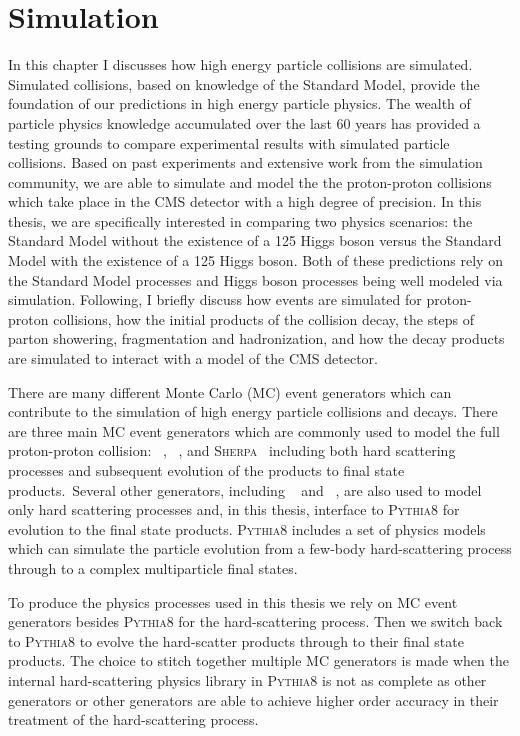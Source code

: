 \chapter{Simulation}
\label{sec:simulation}
In this chapter I discusses how high energy particle
collisions are simulated. Simulated collisions, based on knowledge of the Standard Model, provide 
the foundation of our predictions in high energy particle physics. 
The wealth of particle physics knowledge accumulated over the last 
60 years has provided a testing grounds to compare experimental results with
simulated particle collisions. Based on past experiments and extensive work from the simulation community,
we are able to simulate and model the the proton-proton collisions which take place in the
CMS detector with a high degree of precision. 
In this thesis, we are specifically interested in comparing two physics scenarios: the Standard Model 
without the existence of a 125 \GeV Higgs boson versus the Standard Model with the existence
of a 125 \GeV Higgs boson. Both of these predictions rely on the Standard Model processes and
Higgs boson processes being well modeled via simulation.
Following, I briefly discuss how events are simulated for proton-proton collisions,
how the initial products of the collision decay, the steps of parton showering,
fragmentation and hadronization, and how the decay products are simulated
to interact with a model of the CMS detector.

There are many different Monte Carlo (MC) event generators which can contribute to the 
simulation of high energy particle collisions and decays. There are three main MC event
generators which are commonly used to model the full proton-proton collision: 
\PYTHIA~\cite{Sjostrand:2014zea}, \HERWIG~\cite{Bahr:2008pv}, and \textsc{Sherpa}~\cite{Gleisberg:2008ta}
including both hard scattering processes and subsequent evolution of the products to final 
state products. Several other generators, including \POWHEG~\cite{Alioli:2010xd,Frixione:2007vw}
and \MGAMCNLO~\cite{Alwall:2011uj,Alwall:2014hca}, 
are also used to model only hard scattering processes and, in this thesis, 
interface to \textsc{Pythia8} for evolution to the final state products.
\textsc{Pythia8} includes a set of physics models
which can simulate the particle evolution from a few-body hard-scattering process through
to a complex multiparticle final states.

To produce the physics processes used in this
thesis we rely on MC event generators besides \textsc{Pythia8} for the hard-scattering process.
Then we switch back to \textsc{Pythia8} to evolve the hard-scatter products through 
to their final state products. The
choice to stitch together multiple MC generators is made when the internal
hard-scattering physics library in \textsc{Pythia8} is not as complete as other generators or other
generators are able to achieve higher order accuracy in their treatment of the
hard-scattering process.

